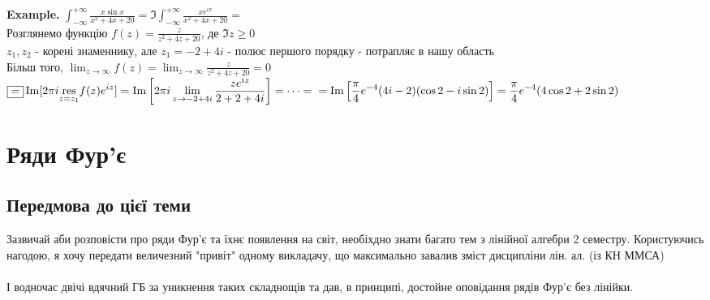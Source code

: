 \documentclass[a4paper, 14pt]{extarticle}
\def\residue#1#2{\underset{z = {#1}}{\textrm{res}} {#2}}
\begin{document}
\textbf{Example.} $\displaystyle \int_{-\infty}^{+\infty} \frac{x \sin x}{x^2+4x+20} = \Im \int_{-\infty}^{+\infty} \frac{x e^{ix}}{x^2+4x+20} \boxed{=}$\\
Розглянемо функцію $\displaystyle f(z) = \frac{z}{z^2+4z+20}$, де $\Im z \geq 0$ \\
$z_1, z_2$ - корені знаменнику, але $z_1 = -2 + 4i$ - полюс першого порядку - потрапляє в нашу область\\
Більш того, $\displaystyle \lim_{z \to \infty} f(z) = \lim_{z \to \infty} \frac{z}{z^2+4z+20} = 0$\\
$\displaystyle \boxed{=} \Im[ 2\pi i \residue{z_1}{f(z)e^{iz}}] = \Im\left[ 2\pi i \lim_{z \to -2+4i} \frac{ze^{iz}}{2+2+4i}\right] = \dots = \\ = \Im\left[ \frac{\pi}{4} e^{-4} (4i-2)(\cos 2 - i \sin 2) \right] = \frac{\pi}{4}e^{-4} (4\cos 2 + 2 \sin 2)$
\newpage




\section{Ряди Фур'є}
\subsection*{Передмова до цієї теми}
Зазвичай аби розповісти про ряди Фур'є та їхнє появлення на світ, необіхдно знати багато тем з лінійної алгебри 2 семестру. Користуючись нагодою, я хочу передати величезний "привіт"  одному викладачу, що максимально завалив зміст дисципліни лін. ал. (із КН ММСА)\\
\\
І водночас двічі вдячний ГБ за уникнення таких складнощів та дав, в принципі, достойне оповідання рядів Фур'є без лінійки.\\
 
\end{document}
